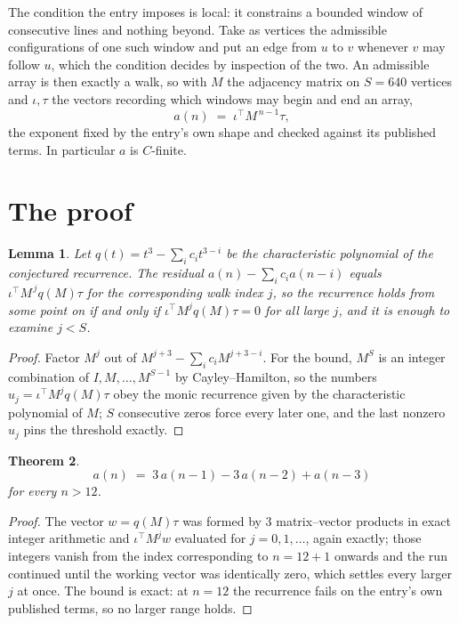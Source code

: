 \documentclass[11pt,a4paper]{article}
\theoremstyle{plain}
\newtheorem{theorem}{Theorem}
\newtheorem{lemma}[theorem]{Lemma}
\theoremstyle{definition}
\begin{document}
The condition the entry imposes is local: it constrains a bounded window of consecutive lines and nothing beyond. Take as
vertices the admissible configurations of one such window and put an edge from $u$ to $v$
whenever $v$ may follow $u$, which the condition decides by inspection of the two. An
admissible array is then exactly a walk, so with $M$ the adjacency matrix on $S=640$ vertices
and $\iota,\tau$ the vectors recording which windows may begin and end an array,
\[
a(n)\;=\;\iota^{\!\top}M^{\,n-1}\tau ,
\]
the exponent fixed by the entry's own shape and checked against its published terms. In
particular $a$ is $C$-finite.

\section{The proof}

\begin{lemma}\label{lem:crit}
Let $q(t)=t^{3}-\sum_i c_it^{3-i}$ be the characteristic polynomial of the
conjectured recurrence. The residual $a(n)-\sum_ic_ia(n-i)$ equals
$\iota^{\!\top}M^{\,j}q(M)\tau$ for the corresponding walk index $j$, so the recurrence
holds from some point on if and only if $\iota^{\!\top}M^{j}q(M)\tau=0$ for all large $j$,
and it is enough to examine $j<S$.
\end{lemma}

\begin{proof}
Factor $M^{j}$ out of $M^{j+3}-\sum_ic_iM^{j+3-i}$. For the bound, $M^{S}$
is an integer combination of $I,M,\dots,M^{S-1}$ by Cayley--Hamilton, so the numbers
$u_j=\iota^{\!\top}M^{j}q(M)\tau$ obey the monic recurrence given by the characteristic
polynomial of $M$; $S$ consecutive zeros force every later one, and the last nonzero $u_j$
pins the threshold exactly.
\end{proof}

\begin{theorem}
\[
a(n)\;=\;3\,a(n-1) - 3\,a(n-2) + a(n-3)
\]
for every $n>12$.
\end{theorem}

\begin{proof}
The vector $w=q(M)\tau$ was formed by $3$ matrix--vector products in exact integer
arithmetic and $\iota^{\!\top}M^{j}w$ evaluated for $j=0,1,\dots$, again exactly; those
integers vanish from the index corresponding to $n=12+1$ onwards and the run continued
until the working vector was identically zero, which settles every larger $j$ at once. The bound is exact: at $n=12$ the recurrence fails on the entry's own published terms, so no larger range holds.
\end{proof}
\end{document}
